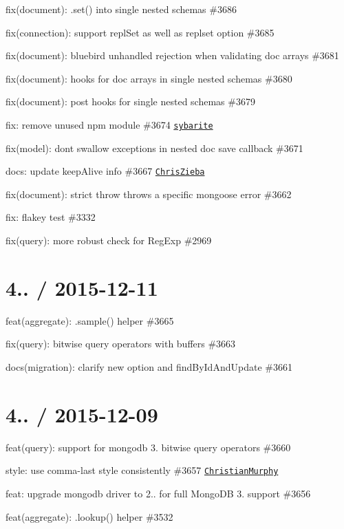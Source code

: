 \begin{DoxyItemize}
\item fix(document)\+: .set() into single nested schemas \#3686
\item fix(connection)\+: support \textquotesingle{}repl\+Set\textquotesingle{} as well as \textquotesingle{}replset\textquotesingle{} option \#3685
\item fix(document)\+: bluebird unhandled rejection when validating doc arrays \#3681
\item fix(document)\+: hooks for doc arrays in single nested schemas \#3680
\item fix(document)\+: post hooks for single nested schemas \#3679
\item fix\+: remove unused npm module \#3674 \href{https://github.com/sybarite}{\tt sybarite}
\item fix(model)\+: don\textquotesingle{}t swallow exceptions in nested doc save callback \#3671
\item docs\+: update keep\+Alive info \#3667 \href{https://github.com/ChrisZieba}{\tt Chris\+Zieba}
\item fix(document)\+: strict \textquotesingle{}throw\textquotesingle{} throws a specific mongoose error \#3662
\item fix\+: flakey test \#3332
\item fix(query)\+: more robust check for Reg\+Exp \#2969
\end{DoxyItemize}

\section*{4.. / 2015-\/12-\/11 }


\begin{DoxyItemize}
\item feat(aggregate)\+: {\ttfamily .sample()} helper \#3665
\item fix(query)\+: bitwise query operators with buffers \#3663
\item docs(migration)\+: clarify {\ttfamily new} option and find\+By\+Id\+And\+Update \#3661
\end{DoxyItemize}

\section*{4.. / 2015-\/12-\/09 }


\begin{DoxyItemize}
\item feat(query)\+: support for mongodb 3. bitwise query operators \#3660
\item style\+: use comma-\/last style consistently \#3657 \href{https://github.com/ChristianMurphy}{\tt Christian\+Murphy}
\item feat\+: upgrade mongodb driver to 2.. for full Mongo\+DB 3. support \#3656
\item feat(aggregate)\+: {\ttfamily .lookup()} helper \#3532
\end{DoxyItemize}

